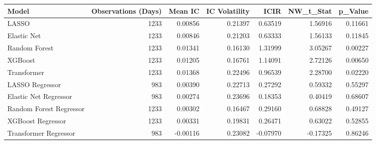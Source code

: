 \begin{tabular}{lrrrrrr}
\toprule
Model & Observations (Days) & Mean IC & IC Volatility & ICIR & NW_t_Stat & p_Value \\
\midrule
LASSO & 1233 & 0.00856 & 0.21397 & 0.63519 & 1.56916 & 0.11661 \\
Elastic Net & 1233 & 0.00846 & 0.21203 & 0.63333 & 1.56133 & 0.11845 \\
Random Forest & 1233 & 0.01341 & 0.16130 & 1.31999 & 3.05267 & 0.00227 \\
XGBoost & 1233 & 0.01205 & 0.16761 & 1.14091 & 2.72126 & 0.00650 \\
Transformer & 1233 & 0.01368 & 0.22496 & 0.96539 & 2.28700 & 0.02220 \\
LASSO Regressor & 983 & 0.00390 & 0.22713 & 0.27292 & 0.59332 & 0.55297 \\
Elastic Net Regressor & 983 & 0.00274 & 0.23696 & 0.18353 & 0.40419 & 0.68607 \\
Random Forest Regressor & 1233 & 0.00302 & 0.16467 & 0.29160 & 0.68828 & 0.49127 \\
XGBoost Regressor & 1233 & 0.00331 & 0.19831 & 0.26471 & 0.63022 & 0.52855 \\
Transformer Regressor & 983 & -0.00116 & 0.23082 & -0.07970 & -0.17325 & 0.86246 \\
\bottomrule
\end{tabular}
